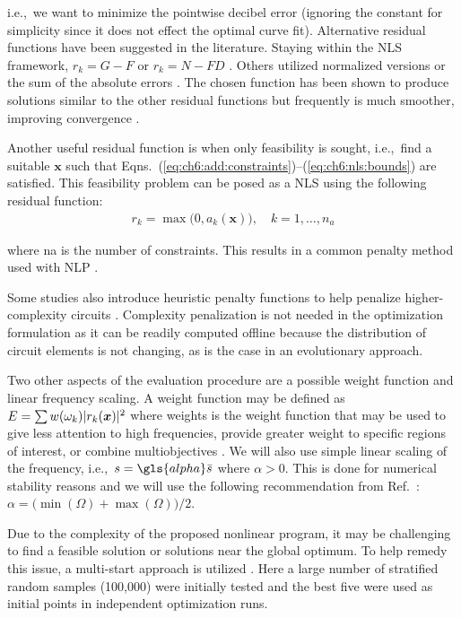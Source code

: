\noindent i.e.,~we want to minimize the pointwise decibel error (ignoring the constant for simplicity since it does not effect the optimal curve fit).
Alternative residual functions have been suggested in the literature. Staying within the NLS framework, $r_k = G - F$ or $r_k = N - FD$ \cite{Levy1959a}.
Others utilized normalized versions \cite{Das2007a, Das2008a} or the sum of the absolute errors \cite{Goh2001a}.
The chosen function has been shown to produce solutions similar to the other residual functions but frequently is much smoother, improving convergence \cite{Arruda1992a}.

Another useful residual function is when only feasibility is sought, i.e.,~find a suitable $\bm{x}$ such that Eqns.~(\ref{eq:ch6:add:constraints})--(\ref{eq:ch6:nls:bounds}) are satisfied.
This feasibility problem can be posed as a NLS using the following residual function:
\begin{align}\label{eq:ch6:res:feas}
r_k = \max\big(0, a_k( \bm{x}) \big), \quad k = 1,\dots,n_a
\end{align}

\noindent where \gls{na} is the number of constraints. This results in a common penalty method used with NLP \cite{Chinneck2008a}. %

Some studies also introduce heuristic penalty functions to help penalize higher-complexity circuits \cite{Grimbleby1995a, Grimbleby2000a}.
Complexity penalization is not needed in the optimization formulation as it can be readily computed offline because the distribution of circuit elements is not changing, as is the case in an evolutionary approach.

Two other aspects of the evaluation procedure are a possible weight function and linear frequency scaling.
A weight function may be defined as $E = \sum w(\omega_k) \lvert r_k(\bm{x})\rvert^2$ where \gls{weights} is the weight function that may be used to give less attention to high frequencies, provide greater weight to specific regions of interest, or combine multiobjectives \cite{Das2007a, Das2008a}.
We will also use simple linear scaling of the frequency, i.e.,~$s = \gls{alpha} \bar{s}$ where $\alpha > 0$.
This is done for numerical stability reasons and we will use the following recommendation from Ref.~\cite{Pintelon1994a}:
$\alpha = \big(\min(\Omega) + \max(\Omega)\big)/2$.

Due to the complexity of the proposed nonlinear program, it may be challenging to find a feasible solution or solutions near the global optimum. 
To help remedy this issue, a multi-start approach is utilized \cite{Marti2003a}.
Here a large number of stratified random samples (100,000) were initially tested and the best five were used as initial points in independent optimization runs.

